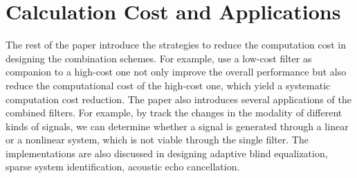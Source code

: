 \documentclass{article}
\begin{document}
\section{Calculation Cost and Applications}
The rest of the paper introduce the strategies to reduce the computation cost in designing the combination schemes. For example, use a low-cost filter as companion to a high-cost one not only improve the overall performance but also reduce the computational cost of the high-cost one, which yield a systematic computation cost reduction. The paper also introduces several applications of the combined filters. For example, by track the changes in the modality of different kinds of signals, we can determine whether a signal is generated through a linear or a nonlinear system, which is not viable through the single filter. The implementations are also discussed in designing adaptive blind equalization, sparse system identification, acoustic echo cancellation. 

\printbibliography
\end{document}
